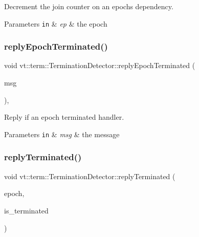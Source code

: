 Decrement the join counter on an epoch\textquotesingle{}s dependency. 


\begin{DoxyParams}[1]{Parameters}
\mbox{\tt in}  & {\em ep} & the epoch \\
\hline
\end{DoxyParams}
\mbox{\label{structvt_1_1term_1_1_termination_detector_ad4e25e7f6a8703bdff30bc2f56ab195f}} 
\subsubsection{\texorpdfstring{reply\+Epoch\+Terminated()}{replyEpochTerminated()}}
{\footnotesize\ttfamily void vt\+::term\+::\+Termination\+Detector\+::reply\+Epoch\+Terminated (\begin{DoxyParamCaption}\item[{\hyperlink{structvt_1_1term_1_1_term_terminated_reply_msg}{Term\+Terminated\+Reply\+Msg} $\ast$}]{msg }\end{DoxyParamCaption})\hspace{0.3cm}{\ttfamily [static]}, {\ttfamily [private]}}



Reply if an epoch terminated handler. 


\begin{DoxyParams}[1]{Parameters}
\mbox{\tt in}  & {\em msg} & the message \\
\hline
\end{DoxyParams}
\mbox{\label{structvt_1_1term_1_1_termination_detector_a4ea359dfd9c7cbd1c8dc96f5dff78ed1}} 
\subsubsection{\texorpdfstring{reply\+Terminated()}{replyTerminated()}}
{\footnotesize\ttfamily void vt\+::term\+::\+Termination\+Detector\+::reply\+Terminated (\begin{DoxyParamCaption}\item[{\hyperlink{namespacevt_a81d11b28122d43bf9834577e4a06440f}{Epoch\+Type} const \&}]{epoch,  }\item[{bool const \&}]{is\+\_\+terminated }\end{DoxyParamCaption})\hspace{0.3cm}{\ttfamily [private]}}



